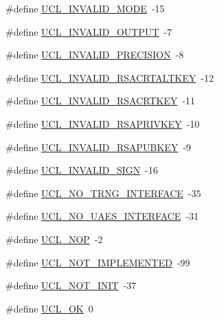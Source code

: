 \begin{DoxyCompactItemize}
\item 
\#define \hyperlink{group___u_c_l___r_e_t_u_r_n_ga41639862646f715bfb747cfe7398e705}{U\+C\+L\+\_\+\+I\+N\+V\+A\+L\+I\+D\+\_\+\+M\+O\+DE}~-\/15
\item 
\#define \hyperlink{group___u_c_l___r_e_t_u_r_n_ga3ed78d658471831fff1612d8d0affb88}{U\+C\+L\+\_\+\+I\+N\+V\+A\+L\+I\+D\+\_\+\+O\+U\+T\+P\+UT}~-\/7
\item 
\#define \hyperlink{group___u_c_l___r_e_t_u_r_n_ga479c5977db40ae908b259d1cce536799}{U\+C\+L\+\_\+\+I\+N\+V\+A\+L\+I\+D\+\_\+\+P\+R\+E\+C\+I\+S\+I\+ON}~-\/8
\item 
\#define \hyperlink{group___u_c_l___r_e_t_u_r_n_ga3c5a146ccf18ee15393bb322f3e042f1}{U\+C\+L\+\_\+\+I\+N\+V\+A\+L\+I\+D\+\_\+\+R\+S\+A\+C\+R\+T\+A\+L\+T\+K\+EY}~-\/12
\item 
\#define \hyperlink{group___u_c_l___r_e_t_u_r_n_ga5a8beb9fe66b842483769e5a6b6dc670}{U\+C\+L\+\_\+\+I\+N\+V\+A\+L\+I\+D\+\_\+\+R\+S\+A\+C\+R\+T\+K\+EY}~-\/11
\item 
\#define \hyperlink{group___u_c_l___r_e_t_u_r_n_gae81f80c201b44b56e74b9598386addb5}{U\+C\+L\+\_\+\+I\+N\+V\+A\+L\+I\+D\+\_\+\+R\+S\+A\+P\+R\+I\+V\+K\+EY}~-\/10
\item 
\#define \hyperlink{group___u_c_l___r_e_t_u_r_n_gaa1a3bbddfcb4ad0e43e1f6cf15cde9ab}{U\+C\+L\+\_\+\+I\+N\+V\+A\+L\+I\+D\+\_\+\+R\+S\+A\+P\+U\+B\+K\+EY}~-\/9
\item 
\#define \hyperlink{group___u_c_l___r_e_t_u_r_n_gad3450e5a68b37eef1ce2d44e36d390b5}{U\+C\+L\+\_\+\+I\+N\+V\+A\+L\+I\+D\+\_\+\+S\+I\+GN}~-\/16
\item 
\#define \hyperlink{group___u_c_l___r_e_t_u_r_n_ga668c018da9085eb011e87324b5c544bd}{U\+C\+L\+\_\+\+N\+O\+\_\+\+T\+R\+N\+G\+\_\+\+I\+N\+T\+E\+R\+F\+A\+CE}~-\/35
\item 
\#define \hyperlink{group___u_c_l___r_e_t_u_r_n_ga53588dab763f3da734c38514d2936f1d}{U\+C\+L\+\_\+\+N\+O\+\_\+\+U\+A\+E\+S\+\_\+\+I\+N\+T\+E\+R\+F\+A\+CE}~-\/31
\item 
\#define \hyperlink{group___u_c_l___r_e_t_u_r_n_ga6ffb73da20c781dcb7f3004102c93aec}{U\+C\+L\+\_\+\+N\+OP}~-\/2
\item 
\#define \hyperlink{group___u_c_l___r_e_t_u_r_n_ga9a88a169ed70729e2b529a2ddfdad426}{U\+C\+L\+\_\+\+N\+O\+T\+\_\+\+I\+M\+P\+L\+E\+M\+E\+N\+T\+ED}~-\/99
\item 
\#define \hyperlink{group___u_c_l___r_e_t_u_r_n_ga8a9136da1288e350a5ec6eed18678631}{U\+C\+L\+\_\+\+N\+O\+T\+\_\+\+I\+N\+IT}~-\/37
\item 
\#define \hyperlink{group___u_c_l___r_e_t_u_r_n_gaf4aeb5212f5aa1b3a12b3dea7eb1785d}{U\+C\+L\+\_\+\+OK}~0

\end{DoxyCompactItemize}
